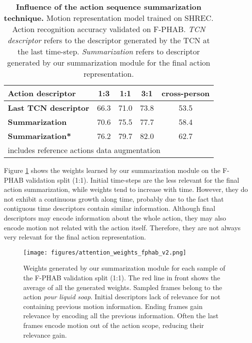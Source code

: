 \documentclass[letterpaper, 10 pt, conference]{ieeeconf}
\begin{document}
\begin{table}[ht]
\centering
\begin{tabular}{|l|c|c|c|c|}
\hline
\textbf{Action descriptor} & \textbf{1:3} & \textbf{1:1} & \textbf{3:1} & \textbf{cross-person} \\ \hline
\textbf{Last TCN descriptor} & 66.3 & 71.0 & 73.8 & 53.5 \\ \hline
\textbf{Summarization} & 70.6 & 75.5 & 77.7 & 58.4 \\ \hline
\textbf{Summarization*} & 76.2 & 79.7 & 82.0 & 62.7 \\ \hline
\multicolumn{5}{l}{\footnotesize  includes reference actions data augmentation} \\
\end{tabular}
\caption{\textbf{Influence of the action sequence summarization technique.} Motion representation model trained on SHREC. Action recognition accuracy validated on F-PHAB. \textit{TCN descriptor} refers to the descriptor generated by the TCN at the last time-step. \textit{Summarization} refers to descriptor generated by our summarization module for the final action representation.}
\label{tab:summ_comp}
\end{table}


Figure \ref{fig:att_weights} shows the weights learned by our summarization module on the F-PHAB validation split (1:1). Initial time-steps are the less relevant for the final action summarization, while weights tend to increase with time. However, they do not  exhibit a continuous growth along time, probably due to the fact that contiguous time descriptors contain similar information. Although final descriptors may encode information about the whole action, they may also encode motion not related with the action itself. Therefore, they are not always very relevant for the final action representation. 




\begin{figure}[ht]
    \centering
\texttt{[image: figures/attention\_weights\_fphab\_v2.png]}
    \caption{Weights generated by our summarization module for each sample of the F-PHAB validation split (1:1).
The red line in front shows the average of all the generated weights.
    Sampled frames belong to the action \textit{pour liquid soap}.
Initial descriptors lack of relevance for not containing previous motion information. Ending frames gain relevance by encoding all the previous information. Often the last frames encode motion out of the action scope, reducing their relevance gain.
    }
    \label{fig:att_weights}
\end{figure}
\end{document}
